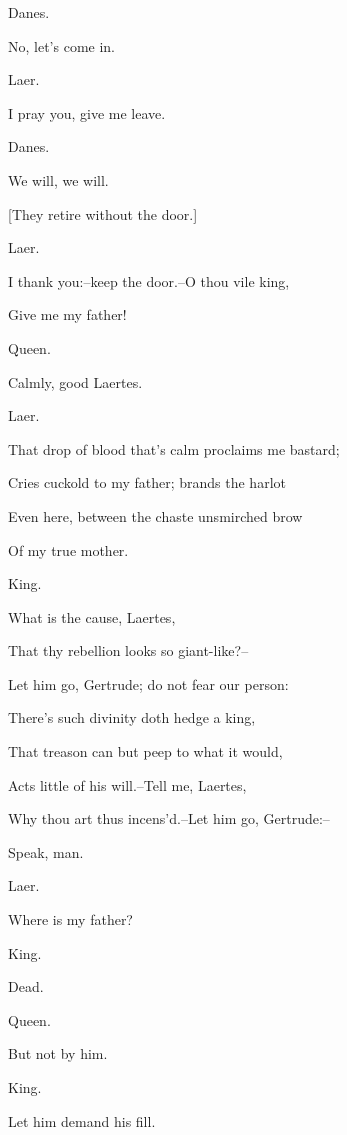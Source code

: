 \documentclass[12pt]{book}
\begin{document}
Danes.

No, let's come in.



Laer.

I pray you, give me leave.



Danes.

We will, we will.



[They retire without the door.]



Laer.

I thank you:--keep the door.--O thou vile king,

Give me my father!



Queen.

Calmly, good Laertes.



Laer.

That drop of blood that's calm proclaims me bastard;

Cries cuckold to my father; brands the harlot

Even here, between the chaste unsmirched brow

Of my true mother.



King.

What is the cause, Laertes,

That thy rebellion looks so giant-like?--

Let him go, Gertrude; do not fear our person:

There's such divinity doth hedge a king,

That treason can but peep to what it would,

Acts little of his will.--Tell me, Laertes,

Why thou art thus incens'd.--Let him go, Gertrude:--

Speak, man.



Laer.

Where is my father?



King.

Dead.



Queen.

But not by him.



King.

Let him demand his fill.
\end{document}
